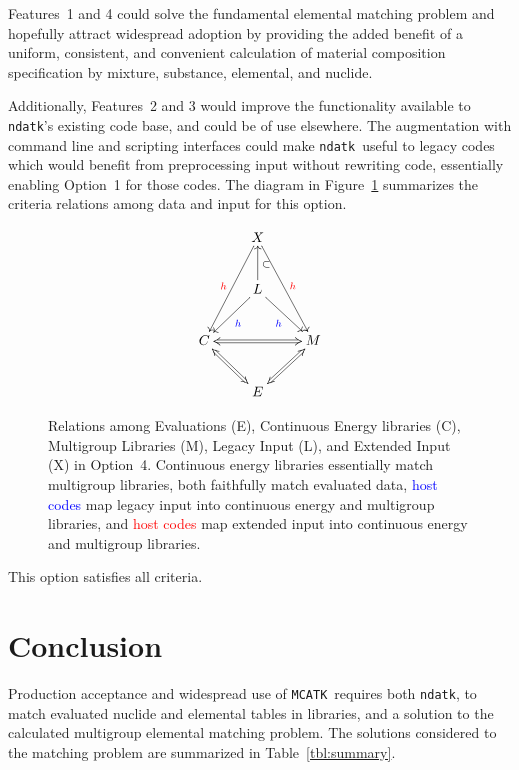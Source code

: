 \documentclass[12pt]{lamemo}
\newcommand{\ndatk}{\texttt{ndatk}}
\newcommand{\MCATK}{\texttt{MCATK}}
\begin{document}
Features~1 and 4 could solve the fundamental elemental matching
problem and hopefully attract widespread adoption by providing the
added benefit of a uniform, consistent, and convenient calculation of
material composition specification by mixture, substance, elemental,
and nuclide.

Additionally, Features~2 and 3 would improve the functionality
available to \ndatk's existing code base, and could be of use
elsewhere.  The augmentation with command line and scripting
interfaces could make \ndatk\ useful to legacy codes which would
benefit from preprocessing input without rewriting code, essentially
enabling Option~1 for those codes.  The diagram in Figure~\ref{fig:4}
summarizes the criteria relations among data and input for this
option.

\begin{figure}\centering
\[
\xymatrix{
  & X \ar[ddl]_{\textcolor{red}{h}} \ar[ddr]^{\textcolor{red}{h}} & \\
  & L \ar[dl]^{\textcolor{blue}{h}} \ar[dr]_{\textcolor{blue}{h}}
  \ar[u]_{\subset} & \\ 
  C \ar@{<=>}[rr] & & M \\
  & E \ar@{<=>}[ul] \ar@{<=>}[ur] &
}
\]
\caption{Relations among Evaluations (E), Continuous Energy libraries
  (C), Multigroup Libraries (M), Legacy Input (L), and Extended Input
  (X) in Option~4.  Continuous energy libraries essentially match
  multigroup libraries, both faithfully match evaluated data,
  \textcolor{blue}{host codes} map legacy input into continuous energy
  and multigroup libraries, and \textcolor{red}{host codes} map
  extended input into continuous energy and multigroup
  libraries. } \label{fig:4}
\end{figure}

This option satisfies all criteria.

\section{Conclusion}

Production acceptance and widespread use of \MCATK\ requires both
\ndatk, to match evaluated nuclide and elemental tables in libraries,
and a solution to the calculated multigroup elemental matching
problem.  The solutions considered to the matching problem are
summarized in Table~\ref{tbl:summary}.
\end{document}
